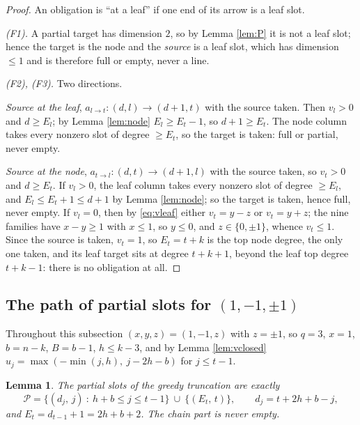 \documentclass[reqno]{amsart}
\theoremstyle{plain}
\newtheorem{lemma}[theorem]{Lemma}
\theoremstyle{definition}
\begin{document}
\begin{proof}
An obligation is ``at a leaf'' if one end of its arrow is a leaf slot.

\emph{(F1).}  A partial target has dimension $2$, so by Lemma \ref{lem:P} it is
not a leaf slot; hence the target is the node and the \emph{source} is a leaf
slot, which has dimension $\le1$ and is therefore full or empty, never a line.

\emph{(F2), (F3).}  Two directions.

\emph{Source at the leaf}, $a_{l\to t}:(d,l)\to(d+1,t)$ with the source taken.
Then $v_l>0$ and $d\ge E_l$; by Lemma \ref{lem:node} $E_l\ge E_t-1$, so
$d+1\ge E_t$.  The node column takes every nonzero slot of degree $\ge E_t$, so
the target is taken: full or partial, never empty.

\emph{Source at the node}, $a_{t\to l}:(d,t)\to(d+1,l)$ with the source taken,
so $v_t>0$ and $d\ge E_t$.  If $v_l>0$, the leaf column takes every nonzero
slot of degree $\ge E_l$, and $E_l\le E_t+1\le d+1$ by Lemma \ref{lem:node}; so
the target is taken, hence full, never empty.  If $v_l=0$, then by
\eqref{eq:vleaf} either $v_t=y-z$ or $v_t=y+z$; the nine families have
$x-y\ge1$ with $x\le1$, so $y\le0$, and $z\in\{0,\pm1\}$, whence $v_t\le1$.
Since the source is taken, $v_t=1$, so $E_t=t+k$ is the top node degree, the
only one taken, and its leaf target sits at degree $t+k+1$, beyond the leaf top
degree $t+k-1$: there is no obligation at all.
\end{proof}

\subsection{The path of partial slots for
\texorpdfstring{$(1,-1,\pm1)$}{(1,-1,+-1)}}

Throughout this subsection $(x,y,z)=(1,-1,z)$ with $z=\pm1$, so $q=3$, $x=1$,
$b=n-k$, $B=b-1$, $h\le k-3$, and by Lemma \ref{lem:vclosed}
$u_j=\max(-\min(j,h),\ j-2h-b)$ for $j\le t-1$.

\begin{lemma}\label{lem:partialset}
The partial slots of the greedy truncation are exactly
\[
   \mathcal{P}=\bigl\{(d_j,\,j)\ :\ h+b\le j\le t-1\bigr\}\ \cup\
   \bigl\{(E_t,\,t)\bigr\},
   \qquad d_j=t+2h+b-j,
\]
and $E_t=d_{t-1}+1=2h+b+2$.  The chain part is never empty.
\end{lemma}
\end{document}

